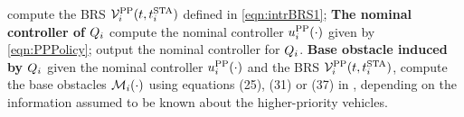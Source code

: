 \begin{algorithm}[tb!]
\begin{small}
{			compute the BRS $\mathcal{V}^{\text{PP}}_{i}(t, t^\text{STA}_i)$ defined in \eqref{eqn:intrBRS1};\;
			\textbf{The nominal controller of $Q_{i}$} \;
			compute the nominal controller ${u^{\text{PP}}_{i}}(\cdot)$ given by \eqref{eqn:PPPolicy};\;
			output the nominal controller for $Q_i$.\;
			\textbf{Base obstacle induced by $Q_{i}$} \;
			given the nominal controller ${u^{\text{PP}}_{i}}(\cdot)$ and the BRS $\mathcal{V}^{\text{PP}}_{i}(t, t^\text{STA}_i)$, compute the base obstacles $\mathcal{M}_i(\cdot)$ using equations (25), (31) or (37) in \cite{Chen2016d}, depending on the information assumed to be known about the higher-priority vehicles.
		}
		\end{small}
\end{algorithm}

%